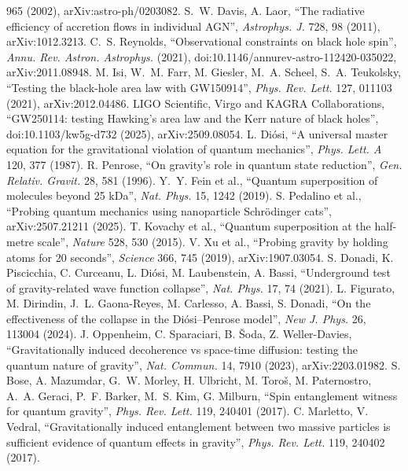 965 (2002), arXiv:astro-ph/0203082.
 S.~W. Davis, A. Laor, ``The radiative efficiency of accretion flows in individual AGN'', \emph{Astrophys. J.} 728, 98
(2011), arXiv:1012.3213.
 C.~S. Reynolds, ``Observational constraints on black hole spin'', \emph{Annu. Rev. Astron. Astrophys.} (2021),
doi:10.1146/annurev-astro-112420-035022, arXiv:2011.08948.
 M. Isi, W.~M. Farr, M. Giesler, M.~A. Scheel, S.~A. Teukolsky, ``Testing the black-hole area law with GW150914'',
\emph{Phys. Rev. Lett.} 127, 011103 (2021), arXiv:2012.04486.
 LIGO Scientific, Virgo and KAGRA Collaborations, ``GW250114: testing Hawking's area law and the Kerr nature of black
holes'', doi:10.1103/kw5g-d732 (2025), arXiv:2509.08054.
 L. Di\'osi, ``A universal master equation for the gravitational violation of quantum mechanics'', \emph{Phys. Lett. A}
120, 377 (1987).
 R. Penrose, ``On gravity's role in quantum state reduction'', \emph{Gen. Relativ. Gravit.} 28, 581 (1996).
 Y.~Y. Fein et al., ``Quantum superposition of molecules beyond 25 kDa'', \emph{Nat. Phys.} 15, 1242 (2019).
 S. Pedalino et al., ``Probing quantum mechanics using nanoparticle Schr\"odinger cats'', arXiv:2507.21211 (2025).
 T. Kovachy et al., ``Quantum superposition at the half-metre scale'', \emph{Nature} 528, 530 (2015).
 V. Xu et al., ``Probing gravity by holding atoms for 20 seconds'', \emph{Science} 366, 745 (2019), arXiv:1907.03054.
 S. Donadi, K. Piscicchia, C. Curceanu, L. Di\'osi, M. Laubenstein, A. Bassi, ``Underground test of gravity-related wave
function collapse'', \emph{Nat. Phys.} 17, 74 (2021).
 L. Figurato, M. Dirindin, J.~L. Gaona-Reyes, M. Carlesso, A. Bassi, S. Donadi, ``On the effectiveness of the collapse
in the Di\'osi--Penrose model'', \emph{New J. Phys.} 26, 113004 (2024).
 J. Oppenheim, C. Sparaciari, B. \v{S}oda, Z. Weller-Davies, ``Gravitationally induced decoherence vs space-time diffusion:
testing the quantum nature of gravity'', \emph{Nat. Commun.} 14, 7910 (2023), arXiv:2203.01982.
 S. Bose, A. Mazumdar, G.~W. Morley, H. Ulbricht, M. Toro\v{s}, M. Paternostro, A.~A. Geraci, P.~F. Barker, M.~S. Kim, G.
Milburn, ``Spin entanglement witness for quantum gravity'', \emph{Phys. Rev. Lett.} 119, 240401 (2017).
 C. Marletto, V. Vedral, ``Gravitationally induced entanglement between two massive particles is sufficient evidence of
quantum effects in gravity'', \emph{Phys. Rev. Lett.} 119, 240402 (2017).
